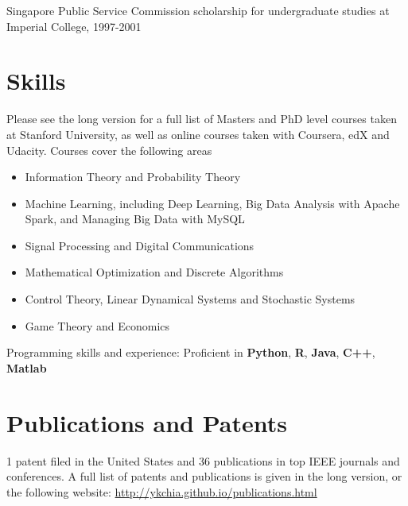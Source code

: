 \documentclass[margin]{res}
\begin{document}
\begin{resume}
Singapore Public Service Commission scholarship for undergraduate studies at Imperial College, 1997-2001

\section{Skills}
Please see the long version for a full list of Masters and PhD level courses taken at Stanford University, as well as online courses taken with Coursera, edX and Udacity. Courses cover the following areas
\begin{itemize}
\item Information Theory and Probability Theory
\item Machine Learning, including Deep Learning, Big Data Analysis with Apache Spark, and Managing Big Data with MySQL
\item Signal Processing and Digital Communications
\item Mathematical Optimization and Discrete Algorithms
\item Control Theory, Linear Dynamical Systems and Stochastic Systems
\item Game Theory and Economics
\end{itemize}
\iffalse
\textbf{Masters and PhD level courses} taken at Stanford University: \textbf{Information Theory, Probability Theory and Stochastic Systems}; \textbf{Machine Learning and Signal Processing}; \textbf{Mathematical Optimization and Discrete Algorithms}; \textbf{Control Theory, Game Theory and Economics}. 

\textbf{Online courses:} I have also taken and completed the following online courses: \textbf{Machine Learning (Coursera), May 2014}, \textbf{Introduction to Statistical Learning with R (Stanford Online), April 2014}.

A full list of courses taken is given in \textbf{Appendix A}
\fi
Programming skills and experience: Proficient in \textbf{Python}, \textbf{R}, \textbf{Java}, \textbf{C++}, \textbf{Matlab} 

\section{Publications and Patents}
1 patent filed in the United States and 36 publications in top IEEE journals and conferences. A full list of patents and publications is given in the long version, or the following website:
\url{http://ykchia.github.io/publications.html}


\end{resume}
\end{document}
